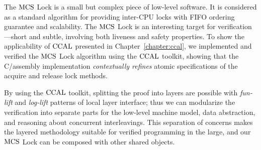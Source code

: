 
The $\mathrm{MCS}$ Lock is a small but complex piece of low-level software.
It is considered as a standard algorithm for providing inter-CPU locks with FIFO ordering guarantee and scalability.
The $\mathrm{MCS}$ Lock is an interesting target for verification---short and subtle, involving both liveness and safety properties. 
To show the applicability of $\mathrm{CCAL}$ presented in Chapter~\ref{chapter:ccal},
we implemented and verified the $\mathrm{MCS}$ Lock algorithm using the $\mathrm{CCAL}$ toolkit, 
showing that the C/assembly implementation {\em contextually refines} atomic specifications of the acquire and release lock methods.

By using the $\mathrm{CCAL}$ toolkit, splitting the proof into layers are possible with  \textit{fun-lift} and \textit{log-lift} patterns of local layer interface;
thus we can modularize the verification into separate parts for the low-level machine model, data abstraction, and reasoning about concurrent interleavings.
This separation of concerns makes the layered methodology suitable for verified programming in the large, and our 
$\mathrm{MCS}$ Lock can be composed with other shared objects.

